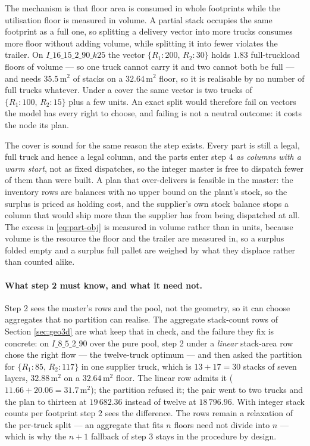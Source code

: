 The mechanism is that floor area is consumed in whole footprints while
the utilisation floor is measured in volume. A partial stack occupies
the same footprint as a full one, so splitting a delivery vector into
more trucks consumes more floor without adding volume, while splitting
it into fewer violates the trailer. On
$I\_16\_15\_2\_90\_k25$ the vector $\{R_{1}\!:\!200,\,R_{2}\!:\!30\}$
holds $1.83$ full-truckload floors of volume --- so one truck cannot
carry it and two cannot both be full --- and needs $35.5\,\mathrm{m}^{2}$
of stacks on a $32.64\,\mathrm{m}^{2}$ floor, so it is realisable by no
number of full trucks whatever. Under a cover the same vector is two
trucks of $\{R_{1}\!:\!100,\,R_{2}\!:\!15\}$ plus a few units.
An exact split would therefore fail on vectors the model has every right
to choose, and failing is not a neutral outcome: it costs the node its
plan.

The cover is sound for the same reason the step exists. Every part is
still a legal, full truck and hence a legal column, and the parts enter
step 4 \emph{as columns with a warm start}, not as fixed dispatches, so
the integer master is free to dispatch fewer of them than were built. A
plan that over-delivers is feasible in the master: the inventory rows
are balances with no upper bound on the plant's stock, so the surplus is
priced as holding cost, and the supplier's own stock balance stops a
column that would ship more than the supplier has from being dispatched
at all. The excess in \eqref{eq:part-obj} is measured in volume rather
than in units, because volume is the resource the floor and the trailer
are measured in, so a surplus folded empty and a surplus full pallet are
weighed by what they displace rather than counted alike.

\paragraph{What step 2 must know, and what it need not.}
Step 2 sees the master's rows and the pool, not the geometry, so it can
choose aggregates that no partition can realise. The aggregate
stack-count rows of Section \ref{sec:geo3d} are what keep that in
check, and the failure they fix is concrete: on $I\_8\_5\_2\_90$ over
the pure pool, step 2 under a \emph{linear} stack-area row chose the
right flow --- the twelve-truck optimum --- and then asked the partition
for $\{R_{1}\!:\!85,\,R_{2}\!:\!117\}$ in one supplier truck, which is
$13+17=30$ stacks of seven layers, $32.88\,\mathrm{m}^{2}$ on a
$32.64\,\mathrm{m}^{2}$ floor. The linear row admits it
($11.66+20.06=31.7\,\mathrm{m}^{2}$); the partition refused it; the pair
went to two trucks and the plan to thirteen at $19\,682.36$ instead of
twelve at $18\,796.96$. With integer stack counts per footprint step 2
sees the difference. The rows remain a relaxation of the per-truck split
--- an aggregate that fits $n$ floors need not divide into $n$ --- which
is why the $n+1$ fallback of step 3 stays in the procedure by design.

